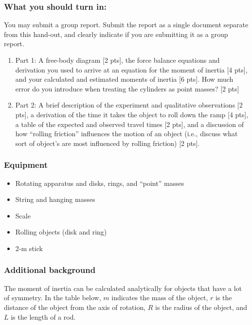 \documentclass[11pt,letterpaper]{article}
\begin{document}
\subsubsection*{What you should turn in:} 
You may submit a group report. Submit the report as a single document separate from this hand-out, and clearly indicate if you are submitting it as a group report.
\begin{enumerate}
\setlength{\parskip}{3pt}
\item Part 1: A free-body diagram [2 pts], the force balance equations and derivation you used to arrive at an equation for the moment of inertia [4 pts], and your calculated and estimated moments of inertia [6 pts]. How much error do you introduce when treating the cylinders as point masses? [2 pts]
\item Part 2: A brief description of the experiment and qualitative observations [2 pts], a derivation of the time it takes the object to roll down the ramp [4 pts], a table of the expected and observed travel times [2 pts], and a discussion of how ``rolling friction'' influences the motion of an object (i.e., discuss what sort of object's are most influenced by rolling friction) [2 pts].
\end{enumerate}

\subsubsection*{Equipment}
\begin{itemize}
\setlength{\parskip}{3pt}
\item Rotating apparatus and disks, rings, and ``point'' masses
\item String and hanging masses
\item Scale
\item Rolling objects (disk and ring)
\item 2-m stick
\end{itemize}

\pagebreak
\subsubsection*{Additional background}
The moment of inertia can be calculated analytically for objects that have a lot of symmetry. In the table below, $m$ indicates the mass of the object, $r$ is the distance of the object from the axis of rotation, $R$ is the radius of the object, and $L$ is the length of a rod.
\end{document}
